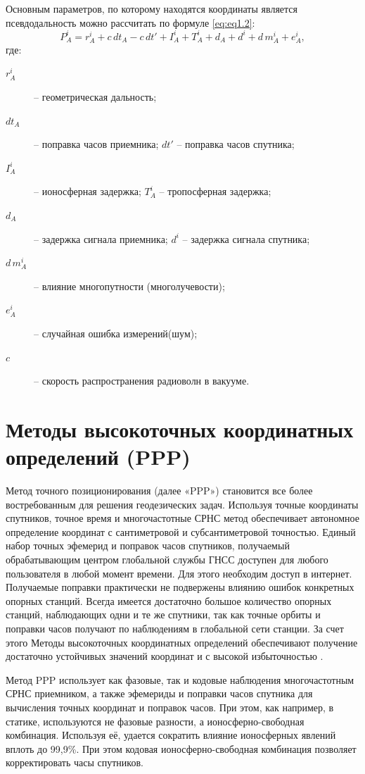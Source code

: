 Основным параметров, по которому находятся координаты является псевдодальность можно рассчитать по формуле \cref{eq:eq1.2}:
\begin{equation}
	\label{eq:eq1.2}
	P^i_A=r^i_A+c\,dt_A-c\,dt'+I^i_A+T^i_A+d_A+d^i+d\,m^i_A+e^i_A,
\end{equation}
где: 
\begin{description}
	\item[$r^i_A$] -- геометрическая дальность; 
	\item[$dt_A$] -- поправка часов приемника;  $dt'$ -- поправка часов спутника;
	\item[$I^i_A$] -- ионосферная задержка;  $T^i_A$ -- тропосферная задержка;
	\item[$d_A$] -- задержка сигнала приемника;  $d^i$ -- задержка сигнала спутника;
	\item[$d\,m^i_A$] -- влияние многопутности (многолучевости); 
	\item[$e^i_A$] -- случайная ошибка измерений(шум);
	\item[$c$] -- скорость распространения радиоволн в вакууме.
\end{description}



\section{Методы высокоточных координатных определений (PPP) }\label{sec:ch1/sec2}

Метод точного позиционирования (далее «PPP») становится все более востребованным для решения геодезических задач. Используя точные координаты спутников, точное время и многочастотные СРНС метод обеспечивает автономное определение координат с сантиметровой и субсантиметровой точностью. Единый набор точных эфемерид и поправок часов спутников, получаемый обрабатывающим центром глобальной службы ГНСС доступен для любого пользователя в любой момент времени. Для этого необходим доступ в интернет. Получаемые поправки практически не подвержены влиянию ошибок конкретных опорных станций. Всегда имеется достаточно большое количество опорных станций, наблюдающих одни и те же спутники, так как точные орбиты и поправки часов получают по наблюдениям в глобальной сети станции. За счет этого Методы высокоточных координатных определений обеспечивают получение достаточно устойчивых значений координат и с высокой избыточностью \cite{src74,src75,src76,src77}. 

Метод PPP использует как фазовые, так и кодовые наблюдения многочастотным СРНС приемником, а также эфемериды и поправки часов спутника для вычисления точных координат и поправок часов. При этом, как например, в статике, используются не фазовые разности, а ионосферно-свободная комбинация. Используя её, удается сократить влияние ионосферных явлений вплоть до 99,9\%. При этом кодовая ионосферно-свободная комбинация позволяет корректировать часы спутников. \cite{Kaftan_new}

